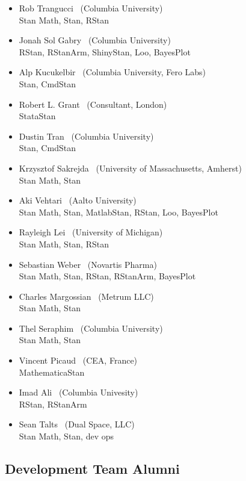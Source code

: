 \begin{itemize}
\\ {\footnotesize MatlabStan}
\item Rob Trangucci \   (Columbia University)
\\ {\footnotesize Stan Math, Stan, RStan}
\item Jonah Sol Gabry \ (Columbia University)
\\ {\footnotesize RStan, RStanArm, ShinyStan, Loo, BayesPlot}
\item Alp Kucukelbir \ (Columbia University, Fero Labs)
\\ {\footnotesize Stan, CmdStan}
\item Robert L. Grant \ (Consultant, London)
\\ {\footnotesize StataStan}
\item Dustin Tran \ (Columbia University)
\\ {\footnotesize Stan, CmdStan}
\item Krzysztof Sakrejda \ (University of Massachusetts, Amherst)
\\ {\footnotesize Stan Math, Stan}
\item Aki Vehtari \ (Aalto University) \\ {\footnotesize Stan Math,
    Stan, MatlabStan, RStan, Loo, BayesPlot}
\item Rayleigh Lei \ (University of Michigan)
\\ {\footnotesize Stan Math, Stan, RStan}
\item Sebastian Weber \ (Novartis Pharma)
\\ {\footnotesize Stan Math, Stan, RStan, RStanArm, BayesPlot}
\item Charles Margossian \ (Metrum LLC)
\\ {\footnotesize Stan Math, Stan}
\item Thel Seraphim \ (Columbia University)
\\ {\footnotesize Stan Math, Stan}
\item Vincent Picaud \ (CEA, France)
\\ {\footnotesize MathematicaStan}
\item Imad Ali \ (Columbia Univesity)
\\ {\footnotesize RStan, RStanArm}
\item Sean Talts \ (Dual Space, LLC)
\\ {\footnotesize Stan Math, Stan, dev ops}
\end{itemize}

\subsection*{Development Team Alumni}

